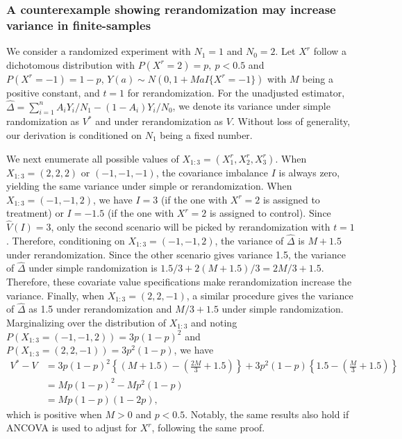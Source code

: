 \documentclass[12pt]{article}
\newcommand{\bI}{\boldsymbol{I}}
\newcommand{\bR}{\boldsymbol{R}}
\newcommand{\bD}{\boldsymbol{D}}
\newcommand{\bfV}{\mathbf{V}}
\newcommand{\bfH}{\mathbf{H}}
\begin{document}





\subsubsection{A counterexample showing rerandomization may increase variance in finite-samples}


We consider a randomized experiment with $N_1 = 1$ and $N_0=2$. Let $X^r$ follow a dichotomous distribution with $P(X^r=2) = p,\ p < 0.5$ and $P(X^r=-1)=1-p$, $Y(a) \sim N(0, 1 + M a I\{X^r = -1\})$ with $M$ being a positive constant, and $t=1$ for rerandomization. For the unadjusted estimator, $\widehat{\Delta} = \sum_{i=1}^n {A_iY_i/N_1 - (1-A_i)Y_i/N_0}$, we denote its variance under simple randomization as $V^*$ and under rerandomization as $V$. Without loss of generality, our derivation is conditioned on $N_1$ being a fixed number. 

We next enumerate all possible values of $X_{1:3} = (X_1^r,X_2^r, X_3^r)$. When $X_{1:3} = (2,2,2)$ or $(-1,-1,-1)$, the covariance imbalance $I$ is always zero, yielding the same variance under simple or rerandomization. When $X_{1:3} = (-1,-1,2)$, we have $I = 3$ (if the one with $X^r =2$ is assigned to treatment) or $I=-1.5$ (if the one with $X^r =2$ is assigned to control). Since $\widehat{V}(I) = 3$, only the second scenario will be picked by rerandomization with $t=1$. Therefore, conditioning on $X_{1:3} = (-1,-1,2)$, the variance of $\widehat{\Delta}$ is $ M+1.5$ under rerandomization. Since the other scenario gives variance 1.5, the variance of $\widehat{\Delta}$ under simple randomization is $1.5/3 + 2(M+1.5)/3 = 2M/3 + 1.5$. Therefore, these covariate value specifications make rerandomization increase the variance. Finally, when $X_{1:3} = (2,2,-1)$, a similar procedure gives the variance of $\widehat{\Delta}$ as 1.5 under rerandomization and $M/3 + 1.5$ under simple randomization. Marginalizing over the distribution of $X_{1:3}$ and noting $P(X_{1:3} = (-1,-1,2)) = 3p(1-p)^2$ and $P(X_{1:3} = (2,2,-1)) = 3p^2(1-p)$, we have
\begin{align*}
    V^*-V &= 3p(1-p)^2 \left\{(M + 1.5) - \left(\frac{2M}{3} + 1.5\right)\right\} + 3p^2(1-p) \left\{1.5 - \left(\frac{M}{3} + 1.5\right)\right\} \\
    &= Mp(1-p)^2 - Mp^2(1-p) \\
    &= Mp(1-p)(1-2p),
\end{align*}
 which is positive when $M>0$ and $p< 0.5$.  Notably, the same results also hold if ANCOVA is used to adjust for $X^r$, following the same proof.
\end{document}
